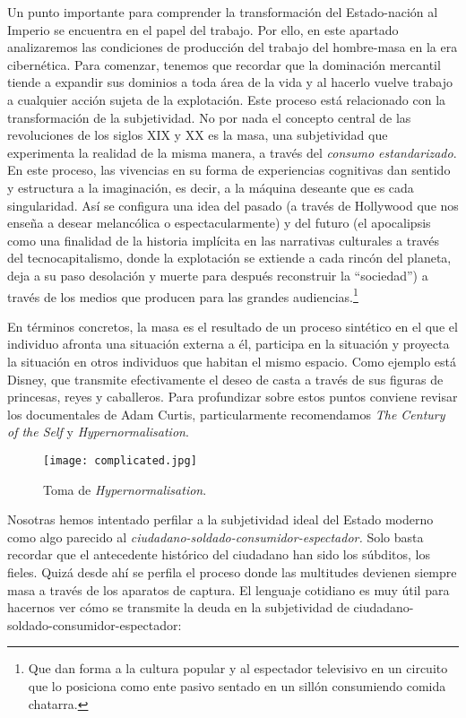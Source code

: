 Un punto importante para comprender la transformación del Estado-nación al Imperio se encuentra en el papel del trabajo. Por ello, en este apartado analizaremos las condiciones de producción del trabajo del hombre-masa en la era cibernética. Para comenzar, tenemos que recordar que la dominación mercantil tiende a expandir sus dominios a toda área de la vida y al hacerlo vuelve trabajo a cualquier acción sujeta de la explotación. Este proceso está relacionado con la transformación de la subjetividad. No por nada el concepto central de las revoluciones de los siglos XIX y XX es la masa, una subjetividad que experimenta la realidad de la misma manera, a través del \emph{consumo estandarizado}. En este proceso, las vivencias en su forma de experiencias cognitivas dan sentido y estructura a la imaginación, es decir, a la máquina deseante que es cada singularidad. Así se configura una idea del pasado (a través de Hollywood que nos enseña a desear melancólica o espectacularmente) y del futuro (el apocalipsis como una finalidad de la historia implícita en las narrativas culturales a través del tecnocapitalismo, donde la explotación se extiende a cada rincón del planeta, deja a su paso desolación y muerte para después reconstruir la \enquote{sociedad}) a través de los medios que producen para las grandes audiencias.\footnote{Que dan forma a la cultura popular y al espectador televisivo en un circuito que lo posiciona como ente pasivo sentado en un sillón consumiendo comida chatarra.}

En términos concretos, la masa es el resultado de un proceso sintético en el que el individuo afronta una situación externa a él, participa en la situación y proyecta la situación en otros individuos que habitan el mismo espacio. Como ejemplo está Disney, que transmite efectivamente el deseo de casta a través de sus figuras de princesas, reyes y caballeros. Para profundizar sobre estos puntos conviene revisar los documentales de Adam Curtis, particularmente recomendamos \emph{The Century of the Self} y \emph{Hypernormalisation}.

\begin{figure}[htbp]
	\centering
	\texttt{[image: complicated.jpg]}
	\caption[\emph{Hypernormalisation}]{Toma de \emph{Hypernormalisation}.}
	\label{fig:hypernormalisation}
\end{figure}

Nosotras hemos intentado perfilar a la subjetividad ideal del Estado moderno como algo parecido al \emph{ciudadano-soldado-consumidor-espectador.} Solo basta recordar que el antecedente histórico del ciudadano han sido los súbditos, los fieles. Quizá desde ahí se perfila el proceso donde las multitudes devienen siempre masa a través de los aparatos de captura. El lenguaje cotidiano es muy útil para hacernos ver cómo se transmite la deuda en la subjetividad de ciudadano-soldado-consumidor-espectador:

